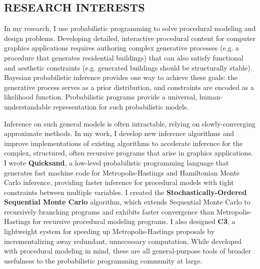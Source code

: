 \documentclass[line,margin]{res}
\begin{document}
\address{\url{dritchie@stanford.edu} | \url{stanford.edu/~dritchie}}
\address{353 Serra Mall \#381, Stanford, CA 94305}
 
\begin{resume}

\section{RESEARCH INTERESTS}
In my research, I use probabilistic programming to solve procedural modeling and design problems. Developing detailed, interactive procedural content for computer graphics applications requires authoring complex generative processes (e.g. a procedure that generates residential buildings) that can also satisfy functional and aesthetic constraints (e.g. generated buildings should be structurally stable). Bayesian probabilistic inference provides one way to achieve these goals: the generative process serves as a prior distribution, and constraints are encoded as a likelihood function. Probabilistic programs provide a universal, human-understandable representation for such probabilistic models. 

Inference on such general models is often intractable, relying on slowly-converging approximate methods. In my work, I develop new inference algorithms and improve implementations of existing algorithms to accelerate inference for the complex, structured, often recursive programs that arise in graphics applications. I wrote \textbf{Quicksand}, a low-level probabilistic programming language that generates fast machine code for Metropolis-Hastings and Hamiltonian Monte Carlo inference, providing faster inference for procedural models with tight constraints between multiple variables. I created the \textbf{Stochastically-Ordered Sequential Monte Carlo} algorithm, which extends Sequential Monte Carlo to recursively branching programs and exhibits faster convergence than Metropolis-Hastings for recursive procedural modeling programs. I also designed \textbf{C3}, a lightweight system for speeding up Metropolis-Hastings proposals by incrementalizing away redundant, unnecessary computation. While developed with procedural modeling in mind, these are all general-purpose tools of broader usefulness to the probabilistic programming community at large.
 

\end{resume}
\end{document}
